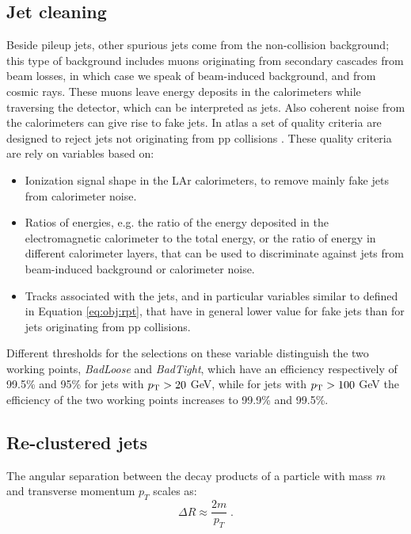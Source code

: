 \subsection{Jet cleaning}
\label{sec:jetcleaning}

Beside pileup jets, other spurious jets come from the non-collision background; this type of background includes muons originating from secondary cascades from beam losses, in which case we speak of beam-induced background, and from cosmic rays. These muons leave energy deposits in the calorimeters while traversing the detector, which can be interpreted as jets. Also coherent noise from the calorimeters can give rise to fake jets. In \gls{atlas} a set of quality criteria are designed to reject jets not originating from \gls{pp} collisions \cite{TheATLAScollaboration:2015ofz}. These quality criteria are rely on variables based on:
\begin{itemize}
\item Ionization signal shape in the LAr calorimeters, to remove mainly fake jets from calorimeter noise. 
\item Ratios of energies, e.g. the ratio of the energy deposited in the electromagnetic calorimeter to the total energy, or the ratio of energy in different calorimeter layers, that can be used to discriminate against jets from beam-induced background or calorimeter noise.
\item Tracks associated with the jets, and in particular variables similar to \RpT defined in Equation \ref{eq:obj:rpt}, that have in general lower value for fake jets than for jets originating from \gls{pp} collisions. 
\end{itemize} 

Different thresholds for the selections on these variable distinguish the two working points, \textit{BadLoose} and \textit{BadTight}, which have an efficiency respectively of 99.5\% and 95\% for jets with $p_{\rm T} > 20$ GeV, while for jets with $p_{\rm T} > 100$ GeV the efficiency of the two working points increases to 99.9\% and 99.5\%. 

\subsection{Re-clustered jets}
\label{sec:reclustering}

The angular separation between the decay products of a particle with mass $m$ and transverse momentum 
$p_T$ scales as:
\begin{equation}
\Delta R \approx \frac{2 m}{p_T} \; .
\end{equation}

